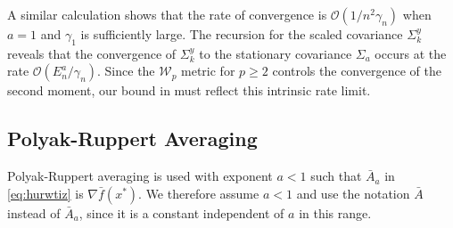 \documentclass[11pt]{article}
\begin{document}
A similar calculation shows that the rate of convergence is $\mathcal{O}(1/n^2 \gamma_n)$ when $a = 1$ and $\gamma_1$ is sufficiently large. 
The recursion for the scaled covariance $\Sigma_k^y$ reveals that the convergence of $\Sigma_k^y$ to the stationary covariance $\Sigma_a$ occurs at the rate $\mathcal{O}(E_n^a/\gamma_n)$. 
Since the $\mathcal{W}_p$ metric for $p \geq 2$ controls the convergence of the second moment, our bound in  must reflect this intrinsic rate limit. 




































\subsection{Polyak-Ruppert Averaging}\label{sec:general_pr}
Polyak-Ruppert averaging is used with \stepsize exponent $a < 1$ such that $\bar{A}_a$ in \eqref{eq:hurwtiz} is $\nabla \bar{f}(x^*)$. 
We therefore assume $a < 1$ and use the notation $\bar{A}$ instead of $\bar{A}_a$, since it is a constant independent of $a$ in this range. 
\end{document}
